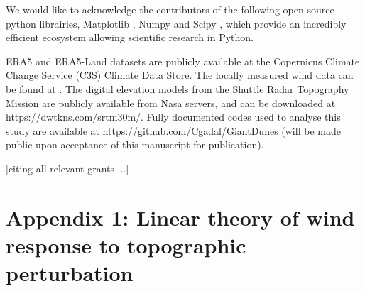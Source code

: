 \begin{acknowledgements}
We would like to acknowledge the contributors of the following open-source python librairies, Matplotlib \citep{Hunter2007}, Numpy \citep{Harris2020} and Scipy \citep{Virtanen2020}, which provide an incredibly efficient ecosystem allowing scientific research in Python.

ERA5 and ERA5-Land datasets are publicly available at the Copernicus Climate Change Service (C3S) Climate Data Store. The locally measured wind data can be found at . The digital elevation models from the Shuttle Radar Topography Mission are publicly available from Nasa servers, and can be downloaded at https://dwtkns.com/srtm30m/. Fully documented codes used to analyse this study are available at https://github.com/Cgadal/GiantDunes (will be made public upon acceptance of this manuscript for publication).

[citing all relevant grants ...] 
\end{acknowledgements}


\section*{Appendix 1: Linear theory of wind response to topographic perturbation}
\label{turbulent_wind_model}

